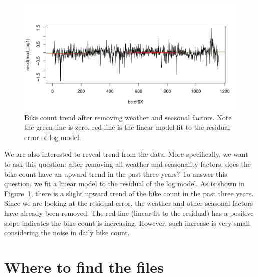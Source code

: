 \documentclass [11pt, proquest] {uwthesis}[2015/03/03]
\begin{document}
\begin{figure}
\includegraphics[width=1\textwidth]{figures/trend}
\caption{Bike count trend after removing weather and seasonal factors. Note the green line is zero, red line is the linear model fit to the residual error of log model.}
\label{fig:trend}
\end{figure}

We are also interested to reveal trend from the data. More specifically, we want to ask this question: after removing all weather and seasonality factors, does the bike count have an upward trend in the past three years? To answer this question, we fit a linear model to the residual of the log model. As is shown in Figure~\ref{fig:trend}, there is a slight upward trend of the bike count in the past three years. Since we are looking at the residual error, the weather and other seasonal factors have already been removed. The red line (linear fit to the residual) has a positive slope indicates the bike count is increasing. However, such increase is very small considering the noise in daily bike count.


% 
 
%
%



%
%
\appendix
\raggedbottom\sloppy
 
 
\chapter{Where to find the files}
 

\end{document}
